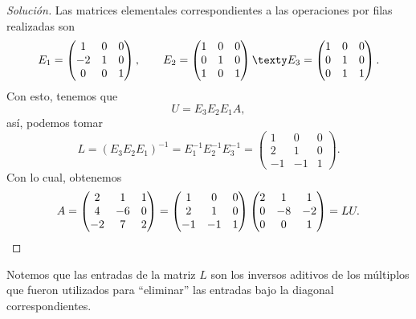 \documentclass[a4,11pt]{aleph-notas}
\begin{document}
\begin{proof}[Solución]
    Las matrices elementales correspondientes a las operaciones por filas realizadas son
    \[
        E_1 = 
        \begin{pmatrix}
             1 &  0 & 0\\
            -2 &  1 & 0\\
             0 &  0 & 1
        \end{pmatrix},
        \qquad
        E_2 = 
        \begin{pmatrix}
             1 &  0 & 0\\
             0 &  1 & 0\\
             1 &  0 & 1
        \end{pmatrix}
        \texty
        E_3 = 
        \begin{pmatrix}
             1 &  0 & 0\\
             0 &  1 & 0\\
             0 &  1 & 1
        \end{pmatrix}.
    \]
    Con esto, tenemos que
    \[
        U = E_3E_2E_1 A,
    \]
    así, podemos tomar
    \[
        L = (E_3E_2E_1)^{-1} = E_1^{-1}E_2^{-1}E_3^{-1} = 
        \begin{pmatrix}
             1 &  0 & 0\\
             2 &  1 & 0\\
            -1 & -1 & 1
        \end{pmatrix}.
    \]
    Con lo cual, obtenemos
    \[
        A = 
        \begin{pmatrix}
             2 &  1 & 1\\
             4 & -6 & 0\\
            -2 &  7 & 2
        \end{pmatrix}
        =
        \begin{pmatrix}
             1 &  0 & 0\\
             2 &  1 & 0\\
            -1 & -1 & 1
        \end{pmatrix}
        \begin{pmatrix}
             2 &  1 & 1\\
             0 & -8 & -2\\
             0 &  0 & 1
        \end{pmatrix}
        = LU.\qedhere
    \]
\end{proof}


\begin{advertencia}
    Notemos que las entradas de la matriz $L$ son los inversos aditivos de los múltiplos que fueron utilizados para ``eliminar'' las entradas bajo la diagonal correspondientes.
\end{advertencia}
\end{document}
